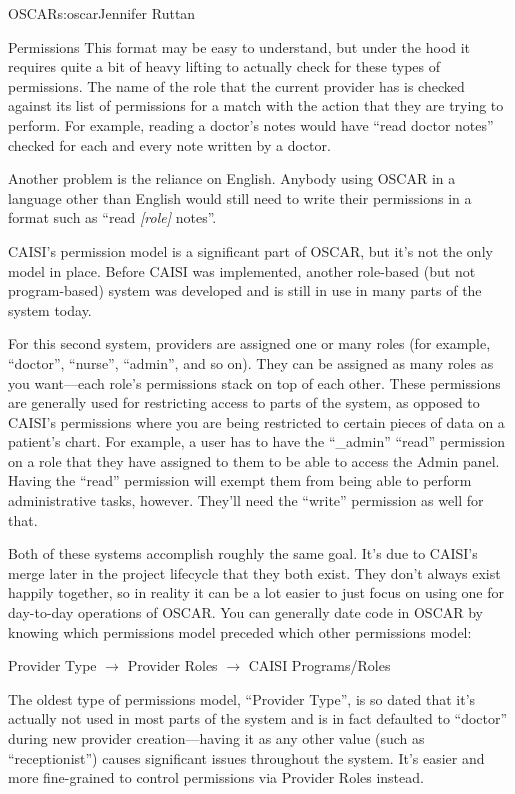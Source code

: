 \begin{aosachapter}{OSCAR}{s:oscar}{Jennifer Ruttan}
\begin{aosasect1}{Permissions}
This format may be easy to understand, but under the hood it requires
quite a bit of heavy lifting to actually check for these types of
permissions. The name of the role that the current provider has is
checked against its list of permissions for a match with the action
that they are trying to perform. For example, reading a doctor's notes
would have ``read doctor notes'' checked for each and every note
written by a doctor.

Another problem is the reliance on English. Anybody using OSCAR in a
language other than English would still need to write their
permissions in a format such as ``read \emph{[role]} notes''.

CAISI's permission model is a significant part of OSCAR, but it's not
the only model in place. Before CAISI was implemented, another
role-based (but not program-based) system was developed and is still
in use in many parts of the system today.

For this second system, providers are assigned one or many roles (for
example, ``doctor'', ``nurse'', ``admin'', and so on). They can be
assigned as many roles as you want---each role's permissions stack on
top of each other. These permissions are generally used for
restricting access to parts of the system, as opposed to CAISI's
permissions where you are being restricted to certain pieces of data
on a patient's chart. For example, a user has to have the ``\_admin''
``read'' permission on a role that they have assigned to them to be
able to access the Admin panel. Having the ``read'' permission will
exempt them from being able to perform administrative tasks,
however. They'll need the ``write'' permission as well for that.

Both of these systems accomplish roughly the same goal. It's due to
CAISI's merge later in the project lifecycle that they both
exist. They don't always exist happily together, so in reality it can
be a lot easier to just focus on using one for day-to-day operations
of OSCAR. You can generally date code in OSCAR by knowing which
permissions model preceded which other permissions model:

Provider Type $\rightarrow$ Provider Roles $\rightarrow$ CAISI Programs/Roles

The oldest type of permissions model, ``Provider Type'', is so dated
that it's actually not used in most parts of the system and is in fact
defaulted to ``doctor'' during new provider creation---having it as
any other value (such as ``receptionist'') causes significant issues
throughout the system. It's easier and more fine-grained to control
permissions via Provider Roles instead.


\end{aosasect1}
\end{aosachapter}
